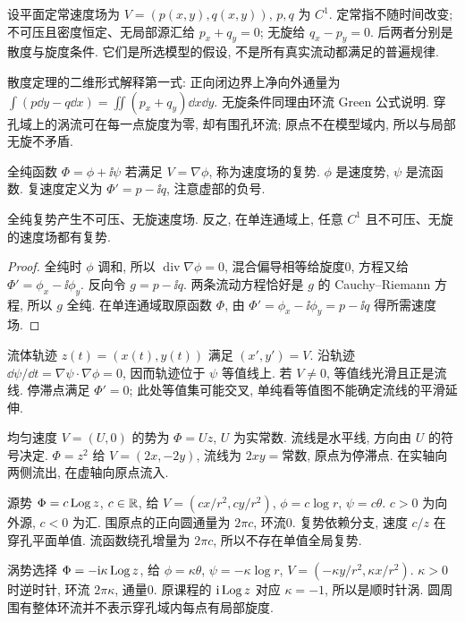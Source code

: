 设平面定常速度场为 $V=(p(x,y),q(x,y))$, $p,q$ 为 $C^1$. 定常指不随时间改变; 不可压且密度恒定、无局部源汇给 $p_x+q_y=0$; 无旋给 $q_x-p_y=0$. 后两者分别是散度与旋度条件. 它们是所选模型的假设, 不是所有真实流动都满足的普遍规律.

散度定理的二维形式解释第一式: 正向闭边界上净向外通量为 $\int(p\dd y-q\dd x)=\iint(p_x+q_y)\dd x\dd y$. 无旋条件同理由环流 Green 公式说明. 穿孔域上的涡流可在每一点旋度为零, 却有围孔环流; 原点不在模型域内, 所以与局部无旋不矛盾.
\begin{definition}
全纯函数 $\Phi=\phi+\ii\psi$ 若满足 $V=\nabla\phi$, 称为速度场的复势. $\phi$ 是速度势, $\psi$ 是流函数. 复速度定义为 $\Phi'=p-\ii q$, 注意虚部的负号.
\end{definition}
\begin{theorem}
全纯复势产生不可压、无旋速度场. 反之, 在单连通域上, 任意 $C^1$ 且不可压、无旋的速度场都有复势.
\end{theorem}
\begin{proof}
全纯时 $\phi$ 调和, 所以 $\operatorname{div}\nabla\phi=0$, 混合偏导相等给旋度0, 方程又给 $\Phi'=\phi_x-\ii\phi_y$. 反向令 $g=p-\ii q$. 两条流动方程恰好是 $g$ 的 Cauchy--Riemann 方程, 所以 $g$ 全纯. 在单连通域取原函数 $\Phi$, 由 $\Phi'=\phi_x-\ii\phi_y=p-\ii q$ 得所需速度场.
\end{proof}
流体轨迹 $z(t)=(x(t),y(t))$ 满足 $(x',y')=V$. 沿轨迹 $\dd\psi/\dd t=\nabla\psi\cdot\nabla\phi=0$, 因而轨迹位于 $\psi$ 等值线上. 若 $V\ne0$, 等值线光滑且正是流线. 停滞点满足 $\Phi'=0$; 此处等值集可能交叉, 单纯看等值图不能确定流线的平滑延伸.

均匀速度 $V=(U,0)$ 的势为 $\Phi=Uz$, $U$ 为实常数. 流线是水平线, 方向由 $U$ 的符号决定. $\Phi=z^2$ 给 $V=(2x,-2y)$, 流线为 $2xy=\text{常数}$, 原点为停滞点. 在实轴向两侧流出, 在虚轴向原点流入.

源势 $\Phi=c\operatorname{Log} z$, $c\in\mathbb R$, 给 $V=(cx/r^2,cy/r^2)$, $\phi=c\log r$, $\psi=c\theta$. $c>0$ 为向外源, $c<0$ 为汇. 围原点的正向圆通量为 $2\pi c$, 环流0. 复势依赖分支, 速度 $c/z$ 在穿孔平面单值. 流函数绕孔增量为 $2\pi c$, 所以不存在单值全局复势.

涡势选择 $\Phi=-\mathrm i\kappa\operatorname{Log} z$, 给 $\phi=\kappa\theta$, $\psi=-\kappa\log r$, $V=(-\kappa y/r^2,\kappa x/r^2)$. $\kappa>0$ 时逆时针, 环流 $2\pi\kappa$, 通量0. 原课程的 $\mathrm i\operatorname{Log} z$ 对应 $\kappa=-1$, 所以是顺时针涡. 圆周围有整体环流并不表示穿孔域内每点有局部旋度.

